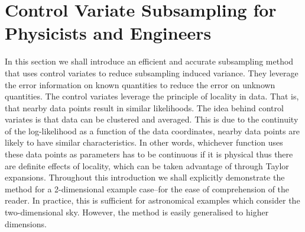 \section{Control Variate Subsampling for Physicists and Engineers}\label{sec:control_variates}

In this section we shall introduce an efficient and accurate subsampling method that uses control variates to reduce subsampling induced variance. They leverage the error information on known quantities to reduce the error on unknown quantities. The control variates leverage the principle of locality in data. That is, that nearby data points result in similar likelihoods. The idea behind control variates is that data can be clustered and averaged. This is due to the continuity of the log-likelihood as a function of the data coordinates, nearby data points are likely to have similar characteristics. In other words, whichever function uses these data points as parameters has to be continuous if it is physical thus there are definite effects of locality, which can be taken advantage of through Taylor expansions. Throughout this introduction we shall explicitly demonstrate the method for a 2-dimensional example case--for the ease of comprehension of the reader. In practice, this is sufficient for astronomical examples which consider the two-dimensional sky. However, the method is easily generalised to higher dimensions.

